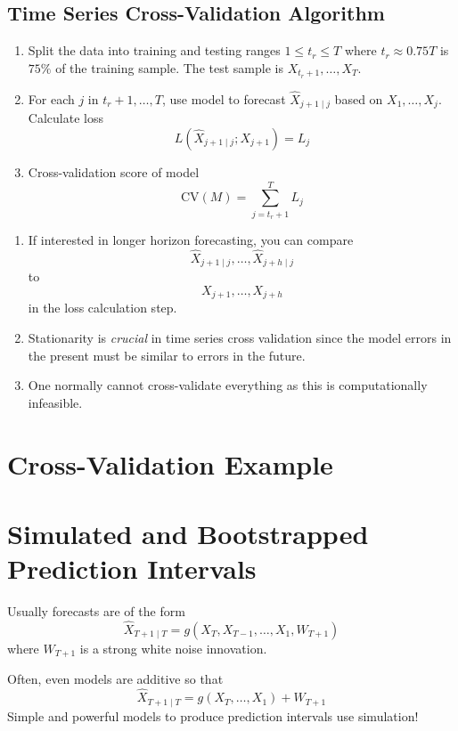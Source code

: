\subsection*{Time Series Cross-Validation Algorithm}
\begin{enumerate}[(1)]
    \item Split the data into training and testing ranges $ 1\le t_r\le T $
          where $ t_r\approx 0.75T $ is $ 75\% $ of the training sample.
          The test sample is $ X_{t_r+1},\ldots,X_T $.
    \item For each $ j $ in $ t_r+1,\ldots,T $, use model to forecast
          $ \hat{X}_{j+1\mid j} $ based on $ X_1,\ldots,X_j $. Calculate loss
          \[ L(\hat{X}_{j+1\mid j};X_{j+1})=L_j \]
    \item Cross-validation score of model
          \[ \text{CV}(M)=\sum_{j=t_r+1}^{T} L_j \]
\end{enumerate}
\begin{Remark}{}{}
    \begin{enumerate}
        \item If interested in longer horizon forecasting, you can compare
              \[ \hat{X}_{j+1\mid j},\ldots,\hat{X}_{j+h\mid j} \]
              to
              \[ X_{j+1},\ldots,X_{j+h} \]
              in the loss calculation step.
        \item Stationarity is \emph{crucial} in time series cross validation
              since the model errors in the present must be similar to errors in the future.
        \item One normally cannot cross-validate everything as this is computationally
              infeasible.
    \end{enumerate}
\end{Remark}
\section{Cross-Validation Example}
\section{Simulated and Bootstrapped Prediction Intervals}
Usually forecasts are of the form
\[ \hat{X}_{T+1\mid T}=g(X_T,X_{T-1},\ldots,X_1,W_{T+1}) \]
where $ W_{T+1} $ is a strong white noise innovation.

Often, even models are additive so that
\[ \hat{X}_{T+1\mid T}=g(X_T,\ldots,X_1)+W_{T+1} \]
Simple and powerful models to produce prediction intervals
use simulation!
